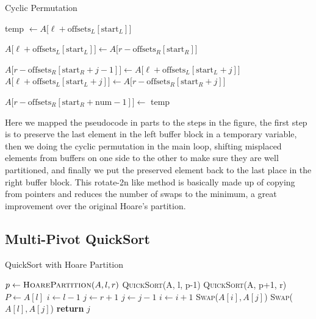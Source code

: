 \documentclass{article}
\begin{document}
\begin{algorithm}[H]
\small
\caption{Cyclic Permutation}\label{CyclicPermutation}
\begin{algorithmic}
    \State temp $\gets A\bigl[\ell +
    \mathrm{offsets}_L[\mathrm{start}_L]\bigr]$  
    
    \State $A\bigl[\ell +
    \mathrm{offsets}_L[\mathrm{start}_L]\bigr] \gets
    A\bigl[r- \mathrm{offsets}_R[\mathrm{start}_R]\bigr]$
    

    \State $A\bigl[r - \mathrm{offsets}_R[\mathrm{start}_R + j - 1]\bigr] \gets
    A\bigl[\ell + \mathrm{offsets}_L[\mathrm{start}_L + j]\bigr]$     
    \State $A\bigl[\ell + \mathrm{offsets}_L[\mathrm{start}_L + j]\bigr]
    \gets A\bigl[r - \mathrm{offsets}_R[\mathrm{start}_R + j ]\bigr]$ 

    \EndFor
    \State $A\bigl[r - \mathrm{offsets}_R[\mathrm{start}_R + \mathrm{num} - 1]\bigr] \gets$
    temp 
\end{algorithmic}
\end{algorithm}

Here we mapped the pseudocode in parts to the steps in the figure, the first step is to preserve the last element in the left buffer block in a temporary variable,
then we doing the cyclic permutation in the main loop, shifting misplaced elements from buffers on one side to the other to make sure they are well partitioned, and finally we put the preserved element back to the last place in the right buffer block.
This rotate-2n like method is basically made up of copying from pointers and reduces the number of swaps to the minimum, a great improvement over the original Hoare's partition.

\subsection{Multi-Pivot QuickSort}
\begin{algorithm}[H]
    \caption{QuickSort with Hoare Partition}\label{HoarePartition}
    \begin{algorithmic}[1]
        \State $p \gets \textsc{HoarePartition}(A, l, r)$
        \State \textsc{QuickSort}(A, l, p-1)
        \State \textsc{QuickSort}(A, p+1, r)
        \EndIf
        \EndProcedure
        \State $P \gets A[l]$ 
        \State $i \gets l - 1$
        \State $j \gets r + 1$
        \Repeat
        \State $j \gets j - 1$
        \Repeat
        \State $i \gets i + 1$
        \State \textsc{Swap}($A[i], A[j]$)
        \EndWhile
        \State \textsc{Swap}($A[l], A[j]$) 
        \State \textbf{return} $j$
        \EndProcedure
    \end{algorithmic}
\end{algorithm}
\end{document}
